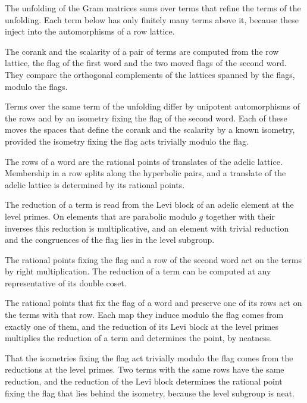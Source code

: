 The unfolding of the Gram matrices sums over terms that refine the terms of the
unfolding. Each term below has only finitely many terms above it, because these
inject into the automorphisms of a row lattice.

The corank and the scalarity of a pair of terms are computed from the row lattice, the flag of the
first word and the two moved flags of the second word. They compare the orthogonal complements of
the lattices spanned by the flags, modulo the flags.

Terms over the same term of the unfolding differ by unipotent automorphisms of the rows and by an
isometry fixing the flag of the second word. Each of these moves the spaces that define the corank
and the scalarity by a known isometry, provided the isometry fixing the flag acts trivially modulo
the flag.

The rows of a word are the rational points of translates of the adelic lattice. Membership in a row
splits along the hyperbolic pairs, and a translate of the adelic lattice is determined by its rational
points.

The reduction of a term is read from the Levi block of an adelic element at the level primes. On
elements that are parabolic modulo $g$ together with their inverses this reduction is multiplicative,
and an element with trivial reduction and the congruences of the flag lies in the level subgroup.

The rational points fixing the flag and a row of the second word act on the terms by right
multiplication. The reduction of a term can be computed at any representative of its double coset.

The rational points that fix the flag of a word and preserve one of its rows act on the terms with that
row. Each map they induce modulo the flag comes from exactly one of them, and the reduction of its
Levi block at the level primes multiplies the reduction of a term and determines the point, by
neatness.

That the isometries fixing the flag act trivially modulo the flag comes from the reductions at the
level primes. Two terms with the same rows have the same reduction, and the reduction of the Levi
block determines the rational point fixing the flag that lies behind the isometry, because the level
subgroup is neat.

